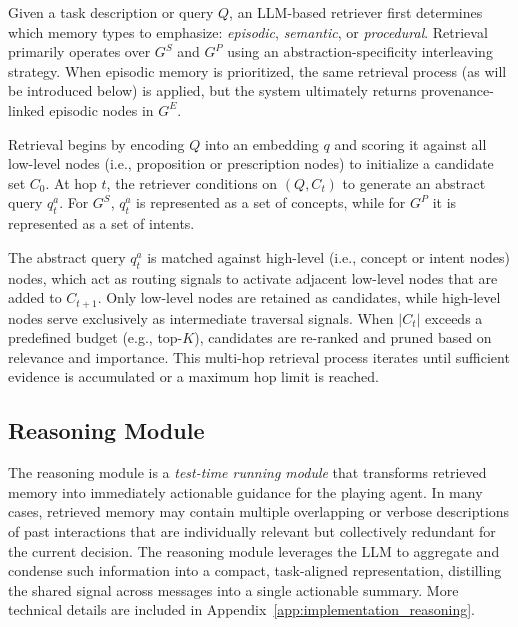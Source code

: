 Given a task description or query $Q$, an LLM-based retriever first determines which memory types to emphasize: \emph{episodic}, \emph{semantic}, or \emph{procedural}.
Retrieval primarily operates over $G^{S}$ and $G^{P}$ using an abstraction-specificity interleaving strategy.
When episodic memory is prioritized, the same retrieval process (as will be introduced below) is applied, but the system ultimately returns provenance-linked episodic nodes in $G^{E}$.

Retrieval begins by encoding $Q$ into an embedding $q$ and scoring it against all low-level nodes (i.e., proposition or prescription nodes) to initialize a candidate set $C_0$.
At hop $t$, the retriever conditions on $(Q, C_t)$ to generate an abstract query $q^{a}_{t}$.
For $G^{S}$, $q^{a}_{t}$ is represented as a set of concepts, while for $G^{P}$ it is represented as a set of intents.

The abstract query $q^{a}_{t}$ is matched against high-level (i.e., concept or intent nodes) nodes, which act as routing signals to activate adjacent low-level nodes that are added to $C_{t+1}$.
Only low-level nodes are retained as candidates, while high-level nodes serve exclusively as intermediate traversal signals.
When $|C_t|$ exceeds a predefined budget (e.g., top-$K$), candidates are re-ranked and pruned based on relevance and importance. This multi-hop retrieval process iterates until sufficient evidence is accumulated or a maximum hop limit is reached.



\subsection{Reasoning Module}
\label{subsec:reasoning}

The reasoning module is a \emph{test-time running module} that transforms retrieved memory into immediately actionable guidance for the playing agent.
In many cases, retrieved memory may contain multiple overlapping or verbose descriptions of past interactions that are individually relevant but collectively redundant for the current decision.
The reasoning module leverages the LLM to aggregate and condense such information into a compact, task-aligned representation, distilling the shared signal across messages into a single actionable summary. More technical details are included in Appendix~\ref{app:implementation_reasoning}.


